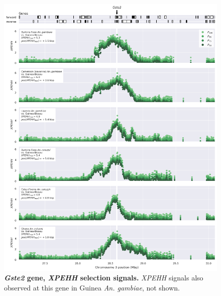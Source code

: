 \documentclass[a4paper,11pt,abstracton,hidelinks]{scrartcl}
\begin{document}
\begin{figure}[t!]
	\begin{center}
		\includegraphics*[width=1.1\linewidth,center]{artwork/locus_gste2_xpehh.png}
	\end{center}
	\caption[\textit{Gste2} gene, \textit{XPEHH} selection signals]{
	\textbf{\textit{Gste2} gene, \textit{XPEHH} selection signals.}
	\textit{XPEHH} signals also observed at this gene in Guinea \textit{An. gambiae}, not shown. 
	} 
	\label{fig:locus_gste2_xpehh}
\end{figure}
\end{document}
